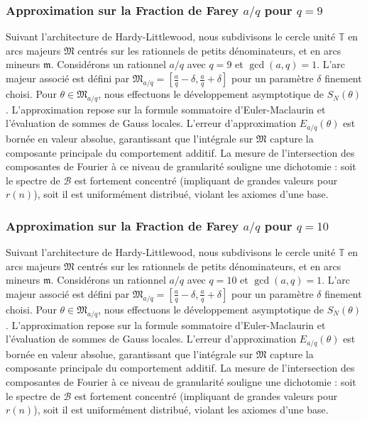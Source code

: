 \documentclass[11pt,a4paper]{article}
\begin{document}
\subsubsection{Approximation sur la Fraction de Farey $a/q$ pour $q=9$}
Suivant l'architecture de Hardy-Littlewood, nous subdivisons le cercle unité $\mathbb{T}$ en arcs majeurs $\mathfrak{M}$ centrés sur les rationnels de petits dénominateurs, et en arcs mineurs $\mathfrak{m}$.
Considérons un rationnel $a/q$ avec $q = 9$ et $\gcd(a,q)=1$. L'arc majeur associé est défini par $\mathfrak{M}_{a/q} = [\frac{a}{q} - \delta, \frac{a}{q} + \delta]$ pour un paramètre $\delta$ finement choisi.
Pour $\theta \in \mathfrak{M}_{a/q}$, nous effectuons le développement asymptotique de $S_N(\theta)$.
L'approximation repose sur la formule sommatoire d'Euler-Maclaurin et l'évaluation de sommes de Gauss locales.
L'erreur d'approximation $E_{a/q}(\theta)$ est bornée en valeur absolue, garantissant que l'intégrale sur $\mathfrak{M}$ capture la composante principale du comportement additif.
La mesure de l'intersection des composantes de Fourier à ce niveau de granularité souligne une dichotomie : soit le spectre de $\mathcal{B}$ est fortement concentré (impliquant de grandes valeurs pour $r(n)$), soit il est uniformément distribué, violant les axiomes d'une base.
\subsubsection{Approximation sur la Fraction de Farey $a/q$ pour $q=10$}
Suivant l'architecture de Hardy-Littlewood, nous subdivisons le cercle unité $\mathbb{T}$ en arcs majeurs $\mathfrak{M}$ centrés sur les rationnels de petits dénominateurs, et en arcs mineurs $\mathfrak{m}$.
Considérons un rationnel $a/q$ avec $q = 10$ et $\gcd(a,q)=1$. L'arc majeur associé est défini par $\mathfrak{M}_{a/q} = [\frac{a}{q} - \delta, \frac{a}{q} + \delta]$ pour un paramètre $\delta$ finement choisi.
Pour $\theta \in \mathfrak{M}_{a/q}$, nous effectuons le développement asymptotique de $S_N(\theta)$.
L'approximation repose sur la formule sommatoire d'Euler-Maclaurin et l'évaluation de sommes de Gauss locales.
L'erreur d'approximation $E_{a/q}(\theta)$ est bornée en valeur absolue, garantissant que l'intégrale sur $\mathfrak{M}$ capture la composante principale du comportement additif.
La mesure de l'intersection des composantes de Fourier à ce niveau de granularité souligne une dichotomie : soit le spectre de $\mathcal{B}$ est fortement concentré (impliquant de grandes valeurs pour $r(n)$), soit il est uniformément distribué, violant les axiomes d'une base.
\end{document}
